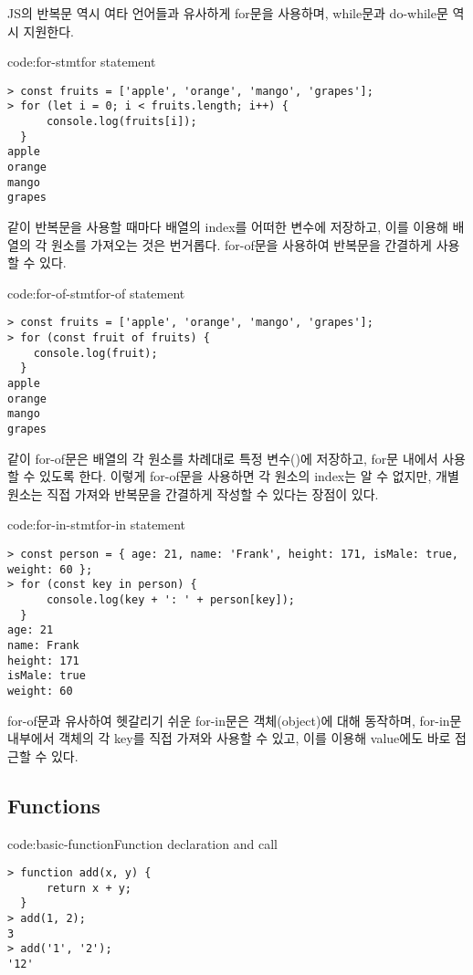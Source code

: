 JS의 반복문 역시 여타 언어들과 유사하게 for문을 사용하며, while문과 do-while문 역시 지원한다.

\begin{codeenv}{code:for-stmt}{for statement}\begin{verbatim}
> const fruits = ['apple', 'orange', 'mango', 'grapes'];
> for (let i = 0; i < fruits.length; i++) {
      console.log(fruits[i]);
  }
apple
orange
mango
grapes
\end{verbatim}
\end{codeenv}

\와 같이 반복문을 사용할 때마다 배열의 index를 어떠한 변수에 저장하고, 이를 이용해 배열의 각 원소를 가져오는 것은 번거롭다. for-of문을 사용하여 반복문을 간결하게 사용할 수 있다.

\begin{codeenv}{code:for-of-stmt}{for-of statement}\begin{verbatim}
> const fruits = ['apple', 'orange', 'mango', 'grapes'];
> for (const fruit of fruits) {
    console.log(fruit);
  }
apple
orange
mango
grapes
\end{verbatim}
\end{codeenv}
\clearpage

\와 같이 for-of문은 배열의 각 원소를 차례대로 특정 변수()에 저장하고, for문 내에서 사용할 수 있도록 한다. 이렇게 for-of문을 사용하면 각 원소의 index는 알 수 없지만, 개별 원소는 직접 가져와 반복문을 간결하게 작성할 수 있다는 장점이 있다.

\begin{codeenv}{code:for-in-stmt}{for-in statement}\begin{verbatim}
> const person = { age: 21, name: 'Frank', height: 171, isMale: true, weight: 60 };
> for (const key in person) {
      console.log(key + ': ' + person[key]);
  }
age: 21
name: Frank
height: 171
isMale: true
weight: 60
\end{verbatim}
\end{codeenv}

for-of문과 유사하여 헷갈리기 쉬운 for-in문은 객체(object)에 대해 동작하며, for-in문 내부에서 객체의 각 key를 직접 가져와 사용할 수 있고, 이를 이용해 value에도 바로 접근할 수 있다.

\subsection*{Functions}

\begin{codeenv}{code:basic-function}{Function declaration and call}\begin{verbatim}
> function add(x, y) {
      return x + y;
  }
> add(1, 2);
3
> add('1', '2');
'12'
\end{verbatim}
\end{codeenv}

